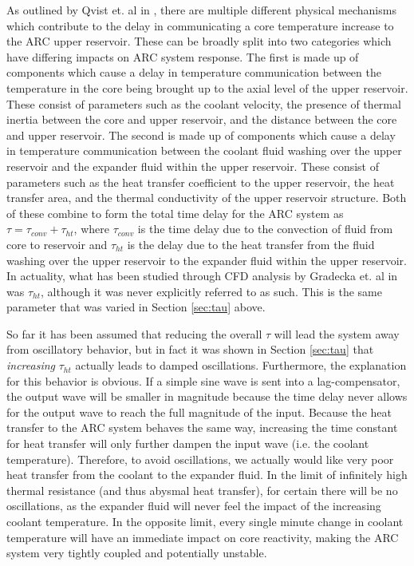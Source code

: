 \documentclass[11pt, oneside]{article}   	%
\begin{document}
As outlined by Qvist et. al in \cite{ARC_Annals}, there are multiple different physical mechanisms which contribute to the delay in communicating a core temperature increase to the ARC upper reservoir.
These can be broadly split into two categories which have differing impacts on ARC system response.
The first is made up of components which cause a delay in temperature communication between the temperature in the core being brought up to the axial level of the upper reservoir.
These consist of parameters such as the coolant velocity, the presence of thermal inertia between the core and upper reservoir, and the distance between the core and upper reservoir.
The second is made up of components which cause a delay in temperature communication between the coolant fluid washing over the upper reservoir and the expander fluid within the upper reservoir.
These consist of parameters such as the heat transfer coefficient to the upper reservoir, the heat transfer area, and the thermal conductivity of the upper reservoir structure.
Both of these combine to form the total time delay for the ARC system as $\tau = \tau_{conv} + \tau_{ht}$, where $\tau_{conv}$ is the time delay due to the convection of fluid from core to reservoir and $\tau_{ht}$ is the delay due to the heat transfer from the fluid washing over the upper reservoir to the expander fluid within the upper reservoir.
In actuality, what has been studied through CFD analysis by Gradecka et. al in \cite{MalwinaReport} was $\tau_{ht}$, although it was never explicitly referred to as such.
This is the same parameter that was varied in Section \ref{sec:tau} above.

So far it has been assumed that reducing the overall $\tau$ will lead the system away from oscillatory behavior, but in fact it was shown in Section \ref{sec:tau} that \textit{increasing} $\tau_{ht}$ actually leads to damped oscillations.
Furthermore, the explanation for this behavior is obvious.
If a simple sine wave is sent into a lag-compensator, the output wave will be smaller in magnitude because the time delay never allows for the output wave to reach the full magnitude of the input.
Because the heat transfer to the ARC system behaves the same way, increasing the time constant for heat transfer will only further dampen the input wave (i.e. the coolant temperature).
Therefore, to avoid oscillations, we actually would like very poor heat transfer from the coolant to the expander fluid. 
In the limit of infinitely high thermal resistance (and thus abysmal heat transfer), for certain there will be no oscillations, as the expander fluid will never feel the impact of the increasing coolant temperature. 
In the opposite limit, every single minute change in coolant temperature will have an immediate impact on core reactivity, making the ARC system very tightly coupled and potentially unstable.
\end{document}
